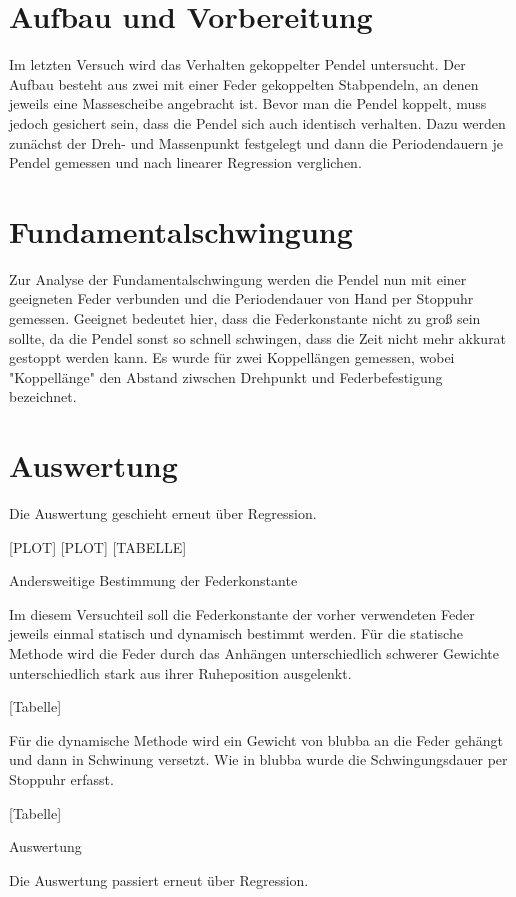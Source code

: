\section{Aufbau und Vorbereitung}

Im letzten Versuch wird das Verhalten gekoppelter Pendel untersucht. Der Aufbau besteht aus zwei mit einer Feder gekoppelten Stabpendeln, an denen jeweils eine Massescheibe angebracht ist.
Bevor man die Pendel koppelt, muss jedoch gesichert sein, dass die Pendel sich auch identisch verhalten.
Dazu werden zunächst der Dreh- und Massenpunkt festgelegt und dann die Periodendauern je Pendel gemessen und nach linearer Regression verglichen.

\section{Fundamentalschwingung}

Zur Analyse der Fundamentalschwingung werden die Pendel nun mit einer geeigneten Feder verbunden und die Periodendauer von Hand per Stoppuhr gemessen.
Geeignet bedeutet hier, dass die Federkonstante nicht zu groß sein sollte, da die Pendel sonst so schnell schwingen, dass die Zeit nicht mehr akkurat gestoppt werden kann.
Es wurde für zwei Koppellängen gemessen, wobei "Koppellänge" den Abstand ziwschen Drehpunkt und Federbefestigung bezeichnet.

\section{Auswertung}

Die Auswertung geschieht erneut über Regression.

[PLOT]
[PLOT]
[TABELLE]

Andersweitige Bestimmung der Federkonstante

Im diesem Versuchteil soll die Federkonstante der vorher verwendeten Feder jeweils einmal statisch und dynamisch bestimmt werden.
Für die statische Methode wird die Feder durch das Anhängen unterschiedlich schwerer Gewichte unterschiedlich stark aus ihrer Ruheposition ausgelenkt.

[Tabelle]

Für die dynamische Methode wird ein Gewicht von blubba an die Feder gehängt und dann in Schwinung versetzt. Wie in blubba wurde die Schwingungsdauer per Stoppuhr erfasst.

[Tabelle]

Auswertung

Die Auswertung passiert erneut über Regression.


